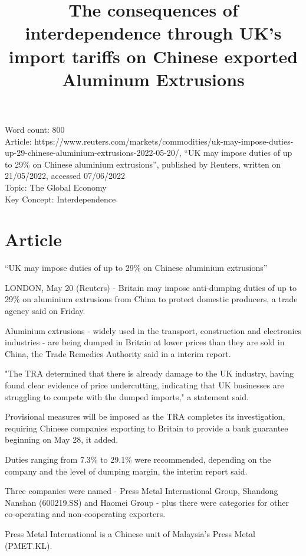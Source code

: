 \documentclass[a4paper,12pt]{article}
\title{The consequences of interdependence through UK's import tariffs on Chinese exported Aluminum Extrusions}
\author{\vspace{-8ex}}
\date{\vspace{-8ex}}
\newcommand{\initTexcount}[1]{\immediate\write18{texcount -inc -incbib
		-sum #1 > .wordcount.tex}}
\newcommand\wordcount{
		}
\begin{document}
\maketitle
Word count: 800\\
Article: https://www.reuters.com/markets/commodities/uk-may-impose-duties-up-29-chinese-aluminium-extrusions-2022-05-20/, ``UK may impose duties of up to 29\% on Chinese aluminium extrusions'', published by Reuters, written on 21/05/2022, accessed 07/06/2022\\
Topic: The Global Economy\\
Key Concept: Interdependence


\newpage

\section*{Article}
``UK may impose duties of up to 29\% on Chinese aluminium extrusions''

LONDON, May 20 (Reuters) - Britain may impose anti-dumping duties of up to 29\% on aluminium extrusions from China to protect domestic producers, a trade agency said on Friday.

Aluminium extrusions - widely used in the transport, construction and electronics industries - are being dumped in Britain at lower prices than they are sold in China, the Trade Remedies Authority said in a interim report.

"The TRA determined that there is already damage to the UK industry, having found clear evidence of price undercutting, indicating that UK businesses are struggling to compete with the dumped imports," a statement said.

Provisional measures will be imposed as the TRA completes its investigation, requiring Chinese companies exporting to Britain to provide a bank guarantee beginning on May 28, it added.

Duties ranging from 7.3\% to 29.1\% were recommended, depending on the company and the level of dumping margin, the interim report said.

Three companies were named - Press Metal International Group, Shandong Nanshan (600219.SS) and Haomei Group - plus there were categories for other co-operating and non-cooperating exporters.

Press Metal International is a Chinese unit of Malaysia's Press Metal (PMET.KL).
\end{document}

